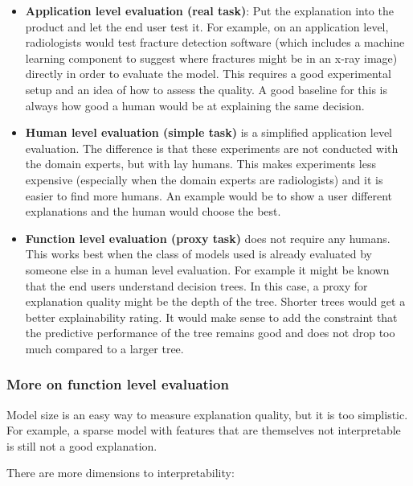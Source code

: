 \documentclass[12pt,]{krantz}
\providecommand{\tightlist}{%
  \setlength{\itemsep}{0pt}\setlength{\parskip}{0pt}}
\theoremstyle{definition}
\theoremstyle{definition}
\theoremstyle{definition}
\theoremstyle{remark}
\begin{document}
\begin{itemize}
\tightlist
\item
  \textbf{Application level evaluation (real task)}: Put the explanation
  into the product and let the end user test it. For example, on an
  application level, radiologists would test fracture detection software
  (which includes a machine learning component to suggest where
  fractures might be in an x-ray image) directly in order to evaluate
  the model. This requires a good experimental setup and an idea of how
  to assess the quality. A good baseline for this is always how good a
  human would be at explaining the same decision.
\item
  \textbf{Human level evaluation (simple task)} is a simplified
  application level evaluation. The difference is that these experiments
  are not conducted with the domain experts, but with lay humans. This
  makes experiments less expensive (especially when the domain experts
  are radiologists) and it is easier to find more humans. An example
  would be to show a user different explanations and the human would
  choose the best.
\item
  \textbf{Function level evaluation (proxy task)} does not require any
  humans. This works best when the class of models used is already
  evaluated by someone else in a human level evaluation. For example it
  might be known that the end users understand decision trees. In this
  case, a proxy for explanation quality might be the depth of the tree.
  Shorter trees would get a better explainability rating. It would make
  sense to add the constraint that the predictive performance of the
  tree remains good and does not drop too much compared to a larger
  tree.
\end{itemize}

\subsubsection{More on function level
evaluation}\label{more-on-function-level-evaluation}

Model size is an easy way to measure explanation quality, but it is too
simplistic. For example, a sparse model with features that are
themselves not interpretable is still not a good explanation.

There are more dimensions to interpretability:
\end{document}
